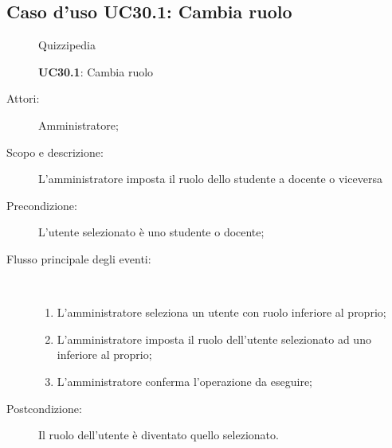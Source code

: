 \subsection{Caso d'uso UC30.1: Cambia ruolo}
	\begin{figure}[H]
		\centering
		\begin{resizedtikzpicture}{\textwidth}
		\begin{umlsystem}[x=0, fill=lightgray!20]{Quizzipedia}
		\end{umlsystem}
		\end{resizedtikzpicture}
		\caption{\textbf{UC30.1}: Cambia ruolo}
		\label{UC30.1}
	\end{figure}
\begin{description}
\item[Attori:] Amministratore;
\item[Scopo e descrizione:] L'amministratore imposta il ruolo dello studente a docente o viceversa
      \item[Precondizione:] L'utente selezionato è uno studente o docente;

        \item[Flusso principale degli eventi:] \ 
 \begin{enumerate}
          \item L'amministratore seleziona un utente con ruolo inferiore al proprio;
          \item L'amministratore imposta il ruolo dell'utente selezionato ad uno inferiore al proprio;
          \item L'amministratore conferma l'operazione da eseguire;

      \end{enumerate}
    \item[Postcondizione:] Il ruolo dell'utente è diventato quello selezionato.
  \end{description}
\hypertarget{UC30.2}{}
